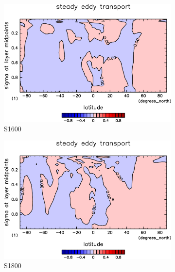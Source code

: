 \documentclass[body]{subfiles}
\begin{document}
\begin{figure}[t]
\begin{subfigure}{.4\textwidth}
		\includegraphics[width=\columnwidth]{S1600/MeriHeatTransTest@dryStatEn_SE,time=3650:4015-crop-rotate.pdf}
		\caption{S1600}\label{乾燥静的エネルギー停滞性擾乱S1600}
	\end{subfigure}
	\begin{subfigure}{.4\textwidth}
		\centering
		\includegraphics[width=\columnwidth]{S1800/MeriHeatTransTest@dryStatEn_SE,time=3650:4015-crop-rotate.pdf}
		\caption{S1800}\label{乾燥静的エネルギー停滞性擾乱S1800}
	\end{subfigure}
	\begin{subfigure}{.4\textwidth}
		\centering

\end{subfigure}
\end{figure}
\end{document}
